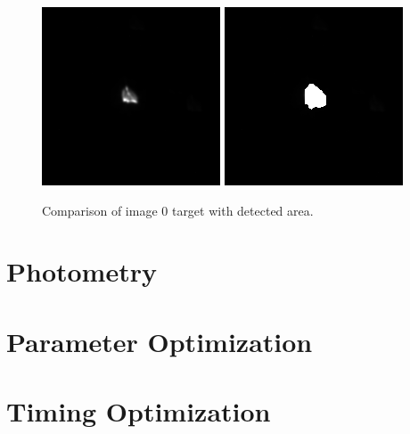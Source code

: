 \documentclass{aa}
\begin{document}
\begin{figure}
\centering

\includegraphics[width=.2\textwidth]{img_0.png}
\includegraphics[width=.2\textwidth]{img_0_canny.png}

\caption{Comparison of image 0 target with detected area.}
\label{fig:img_0_canny}
\end{figure}


\section{Photometry}

\section{Parameter Optimization} \label{sec:param_opt}

\section{Timing Optimization}


%

%
%
\end{document}
